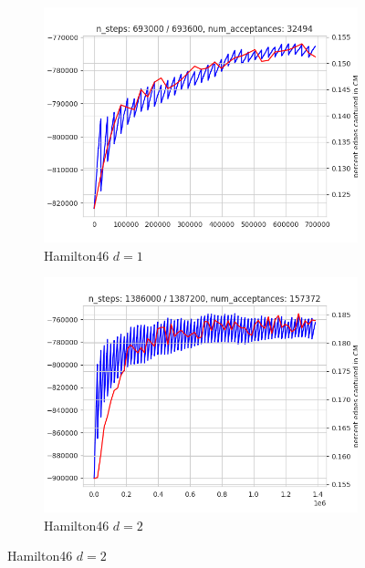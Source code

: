 \begin{figure}
    \vspace{1em}
    \begin{subfigure}{0.49\textwidth}
      \centering
      \includegraphics[width=\linewidth]{figures/MCMC_plots/socfb-Hamilton46-1d.png}
      \caption{Hamilton46 $d=1$}
    \end{subfigure}
    \hfill
    \begin{subfigure}{0.49\textwidth}
      \centering
      \includegraphics[width=\linewidth]{figures/MCMC_plots/socfb-Hamilton46-2d.png}
      \caption{Hamilton46 $d=2$}
    \end{subfigure}
  
  

\end{figure}
